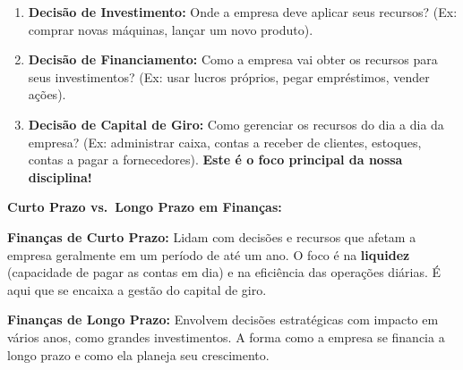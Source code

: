 \documentclass[
  a4paper,
]{book}
\begin{document}
\begin{enumerate}
\def\labelenumi{\arabic{enumi}.}
\item
  \textbf{Decisão de Investimento:} Onde a empresa deve aplicar seus
  recursos? (Ex: comprar novas máquinas, lançar um novo produto).
\item
  \textbf{Decisão de Financiamento:} Como a empresa vai obter os
  recursos para seus investimentos? (Ex: usar lucros próprios, pegar
  empréstimos, vender ações).
\item
  \textbf{Decisão de Capital de Giro:} Como gerenciar os recursos do dia
  a dia da empresa? (Ex: administrar caixa, contas a receber de
  clientes, estoques, contas a pagar a fornecedores). \textbf{Este é o
  foco principal da nossa disciplina!}
\end{enumerate}

\textbf{Curto Prazo vs.~Longo Prazo em Finanças:}

\textbf{Finanças de Curto Prazo:} Lidam com decisões e recursos que
afetam a empresa geralmente em um período de até um ano. O foco é na
\textbf{liquidez} (capacidade de pagar as contas em dia) e na eficiência
das operações diárias. É aqui que se encaixa a gestão do capital de
giro.

\textbf{Finanças de Longo Prazo:} Envolvem decisões estratégicas com
impacto em vários anos, como grandes investimentos. A forma como a
empresa se financia a longo prazo e como ela planeja seu crescimento.
\end{document}
